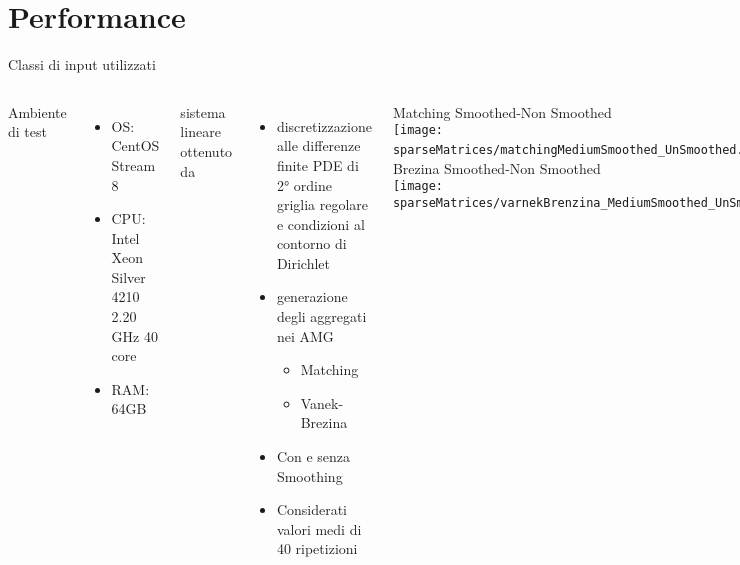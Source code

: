 \section{Performance}
\begin{frame} {Classi di input utilizzati}
\begin{columns}
	Ambiente di test
	\begin{itemize}
		\item	OS: CentOS Stream 8
		\item	CPU: Intel Xeon Silver 4210 2.20 GHz 40 core
		\item	RAM: 64GB
	\end{itemize}
	\pause
	\voidLine
	sistema lineare ottenuto da 
	\pause
	\begin{itemize}
		\item	discretizzazione alle differenze finite PDE di 2° ordine\\
		griglia regolare e condizioni al contorno di Dirichlet
		\pause
		\item	generazione degli aggregati nei AMG
		\begin{itemize}
			\item	Matching
			\item	Vanek-Brezina
		\end{itemize}
		\item	Con e senza Smoothing
		\pause
		\item	Considerati valori medi di 40 ripetizioni
	\end{itemize}
	\tiny Matching Smoothed\quad\quad-\quad\quad Non Smoothed\\
	\texttt{[image: sparseMatrices/matchingMediumSmoothed\_UnSmoothed.ppm.png]}
	\voidLine
	\voidLine
	\tiny Vanek-Brezina Smoothed\quad-\quad Non Smoothed\\ 
	\texttt{[image: sparseMatrices/varnekBrenzina\_MediumSmoothed\_UnSmoothed.ppm.png]}
\end{columns}
\end{frame}

